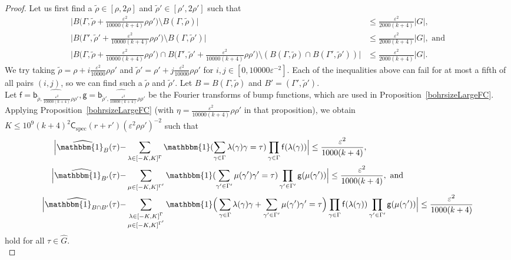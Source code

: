 \documentclass[a4paper,11pt]{article}
\numberwithin{theorem}{section}
\theoremstyle{definition}
\newcommand\id{\mathbbm{1}}
\newcommand{\on}[1]{
	\operatorname{#1}
}
\newcommand\ssk[1]{
	\substack{#1}
}
\begin{document}
\begin{proof}
    Let us first find a $\tilde{\rho} \in [\rho, 2\rho]$ and $\tilde{\rho}' \in [\rho', 2\rho']$ such that 
    \begin{align*}
    \Big|B\Big(\Gamma, \tilde{\rho} + \frac{\varepsilon^2}{10000(k+4)}\rho\rho'\Big) \setminus B(\Gamma, \tilde{\rho})\Big| & \leq \frac{\varepsilon^2}{2000(k+4)}|G|,\\
    \Big| B\Big(\Gamma', \tilde{\rho}' + \frac{\varepsilon^2}{10000(k+4)}\rho\rho'\Big) \setminus B(\Gamma, \tilde{\rho}')\Big| & \leq \frac{\varepsilon^2}{2000(k+4)}|G|,\text{ and}\\
    \Big|B\Big(\Gamma, \tilde{\rho} + \frac{\varepsilon^2}{10000(k+4)}\rho\rho'\Big) \cap  B\Big(\Gamma', \tilde{\rho}' + \frac{\varepsilon^2}{10000(k+4)}\rho\rho'\Big) \setminus (B(\Gamma, \tilde{\rho}) \cap B(\Gamma', \tilde{\rho}')) \Big| & \leq \frac{\varepsilon^2}{2000(k+4)}|G|.
    \end{align*}
    We try taking $\tilde{\rho} = \rho + i \frac{\varepsilon^2}{10000}\rho\rho'$ and $\tilde{\rho}' = \rho' + j \frac{\varepsilon^2}{10000}\rho\rho'$ for $i, j \in [0, 10000 \varepsilon^{-2}]$. Each of the inequalities above can fail for at most a fifth of all pairs $(i,j)$, so we can find such a $\tilde{\rho}$ and $\tilde{\rho}'$. Let $B = B(\Gamma, \tilde{\rho})$ and $B' = (\Gamma', \tilde{\rho}')$.\\

    Let $\mathsf{f} = \widehat{\mathsf{b}_{\tilde{\rho}, \frac{\varepsilon^2}{10000(k+4)}\rho\rho'}}, \mathsf{g} = \widehat{\mathsf{b}_{\tilde{\rho}', \frac{\varepsilon^2}{10000(k+4)}\rho\rho'}}$ be the Fourier transforms of bump functions, which are used in Proposition~\ref{bohrsizeLargeFC}. Applying Proposition~\ref{bohrsizeLargeFC} (with $\eta = \frac{\varepsilon^2}{10000(k+4)}\rho\rho'$ in that proposition), we obtain $K \leq 10^9 (k+4)^2 \mathsf{C}_{\on{spec}} (r + r')(\varepsilon^{2} \rho\rho')^{-2}$ such that 
    \begin{align*}\Big|\widehat{\id_B}(\tau) - & \sum_{\lambda \in [-K, K]^\Gamma} \id(\sum_{\gamma \in \Gamma} \lambda(\gamma)\gamma = \tau) \prod_{\gamma \in \Gamma} \mathsf{f}(\lambda(\gamma)) \Big|\leq \frac{\varepsilon^2}{1000(k+4)},\\
    \Big|\widehat{\id_{B'}}(\tau) - & \sum_{\mu \in [-K, K]^{\Gamma'}} \id(\sum_{\gamma' \in \Gamma'} \mu(\gamma')\gamma' = \tau) \prod_{\gamma' \in \Gamma'} \mathsf{g}(\mu(\gamma')) \Big|\leq \frac{\varepsilon^2}{1000(k+4)},\text{ and}\\
    \Big|\widehat{\id_{B \cap B'}}(\tau) - & \sum_{\ssk{\lambda \in [-K, K]^\Gamma\\\mu \in [-K, K]^{\Gamma'}}} \id\Big(\sum_{\gamma \in \Gamma}  \lambda(\gamma)\gamma + \sum_{\gamma' \in \Gamma'} \mu(\gamma')\gamma' = \tau\Big) \prod_{\gamma \in \Gamma} \mathsf{f}(\lambda(\gamma))\prod_{\gamma' \in \Gamma'} \mathsf{g}(\mu(\gamma'))  \Big|\leq \frac{\varepsilon^2}{1000(k+4)}\end{align*}
    hold for all $\tau \in \hat{G}$.\\


\end{proof}
\end{document}
